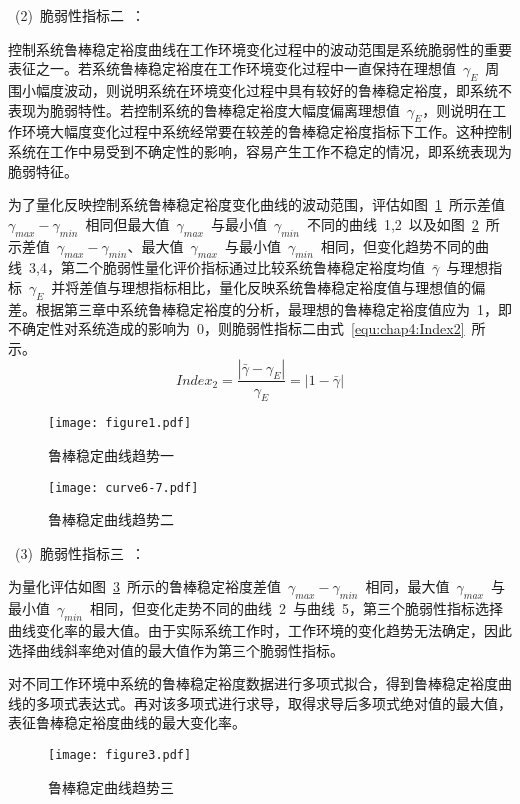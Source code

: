  ~(2)~脆弱性指标二~：

控制系统鲁棒稳定裕度曲线在工作环境变化过程中的波动范围是系统脆弱性的重要表征之一。若系统鲁棒稳定裕度在工作环境变化过程中一直保持在理想值~$\gamma_{E}$~周围小幅度波动，则说明系统在环境变化过程中具有较好的鲁棒稳定裕度，即系统不表现为脆弱特性。若控制系统的鲁棒稳定裕度大幅度偏离理想值~$\gamma_{E}$，则说明在工作环境大幅度变化过程中系统经常要在较差的鲁棒稳定裕度指标下工作。这种控制系统在工作中易受到不确定性的影响，容易产生工作不稳定的情况，即系统表现为脆弱特征。

为了量化反映控制系统鲁棒稳定裕度变化曲线的波动范围，评估如图~\ref{fig:chap4:fig4.1}~所示差值~$\gamma_{max}-\gamma_{min}$~相同但最大值~$\gamma_{max}$~与最小值~$\gamma_{min}$~不同的曲线~1,2~以及如图~\ref{fig:chap4:fig4.2}~所示差值~$\gamma_{max}-\gamma_{min}$、最大值~$\gamma_{max}$~与最小值~$\gamma_{min}$~相同，但变化趋势不同的曲线~3,4，第二个脆弱性量化评价指标通过比较系统鲁棒稳定裕度均值~$\bar{\gamma}$~与理想指标~$\gamma_E$~并将差值与理想指标相比，量化反映系统鲁棒稳定裕度值与理想值的偏差。根据第三章中系统鲁棒稳定裕度的分析，最理想的鲁棒稳定裕度值应为~1，即不确定性对系统造成的影响为~0，则脆弱性指标二由式~\ref{equ:chap4:Index2}~所示。
\begin{equation}\label{equ:chap4:Index2}
  Index_2=\frac{\left|\bar{\gamma}-\gamma_E \right|}{\gamma_E}=\left|1-\bar{\gamma}\right|
\end{equation}
\begin{figure}[htb]
\centering
\texttt{[image: figure1.pdf]}
\caption{鲁棒稳定曲线趋势一}\label{fig:chap4:fig4.1}
\end{figure}
\begin{figure}[htb]
\centering
\texttt{[image: curve6-7.pdf]}
\caption{鲁棒稳定曲线趋势二}\label{fig:chap4:fig4.2}
\end{figure}
\newpage
~(3)~脆弱性指标三~：

为量化评估如图~\ref{fig:chap4:fig4.3}~所示的鲁棒稳定裕度差值~$\gamma_{max}-\gamma_{min}$~相同，最大值~$\gamma_ {max}$~与最小值~$\gamma_{min}$~相同，但变化走势不同的曲线~2~与曲线~5，第三个脆弱性指标选择曲线变化率的最大值。由于实际系统工作时，工作环境的变化趋势无法确定，因此选择曲线斜率绝对值的最大值作为第三个脆弱性指标。

对不同工作环境中系统的鲁棒稳定裕度数据进行多项式拟合，得到鲁棒稳定裕度曲线的多项式表达式。再对该多项式进行求导，取得求导后多项式绝对值的最大值，表征鲁棒稳定裕度曲线的最大变化率。
\begin{figure}[h]
\centering
\texttt{[image: figure3.pdf]}
\caption{鲁棒稳定曲线趋势三}
\label{fig:chap4:fig4.3}
\end{figure}


